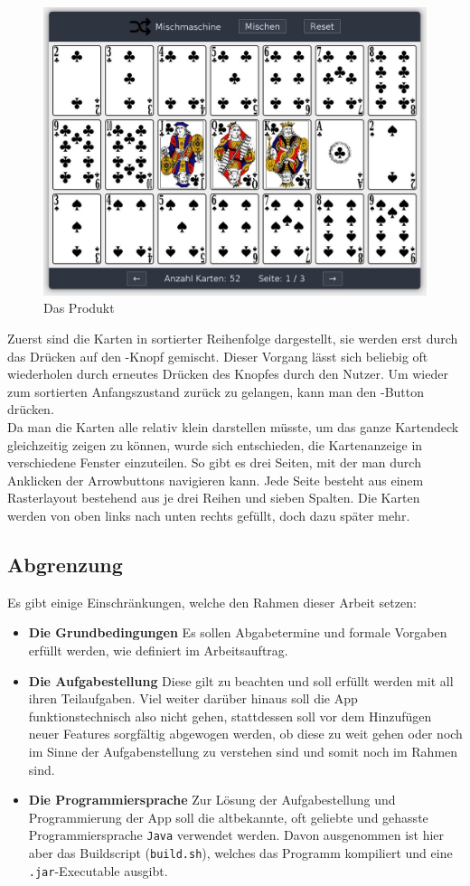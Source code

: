 \documentclass[a4paper,11pt]{article}
\begin{document}
\begin{figure}[H]
    \centering
    \includegraphics[width=.7\textwidth]{media/early-screenshot.jpg}
    \caption{Das Produkt}
\end{figure}

Zuerst sind die Karten in sortierter Reihenfolge dargestellt, sie werden erst durch das Drücken auf den -Knopf gemischt. Dieser Vorgang lässt sich beliebig oft wiederholen durch erneutes Drücken des Knopfes durch den Nutzer. Um wieder zum sortierten Anfangszustand zurück zu gelangen, kann man den -Button drücken.\\

Da man die Karten alle relativ klein darstellen müsste, um das ganze Kartendeck gleichzeitig zeigen zu können, wurde sich entschieden, die Kartenanzeige in verschiedene Fenster einzuteilen. So gibt es drei Seiten, mit der man durch Anklicken der Arrowbuttons navigieren kann. Jede Seite besteht aus einem Rasterlayout bestehend aus je drei Reihen und sieben Spalten. Die Karten werden von oben links nach unten rechts gefüllt, doch dazu später mehr.\\


\subsection{Abgrenzung}
Es gibt einige Einschränkungen, welche den Rahmen dieser Arbeit setzen:

\begin{itemize}
    \item \textbf{Die Grundbedingungen} Es sollen Abgabetermine und formale Vorgaben erfüllt werden, wie definiert im Arbeitsauftrag.
    \item \textbf{Die Aufgabestellung} Diese gilt zu beachten und soll erfüllt werden mit all ihren Teilaufgaben. Viel weiter darüber hinaus soll die App funktionstechnisch also nicht gehen, stattdessen soll vor dem Hinzufügen neuer Features sorgfältig abgewogen werden, ob diese zu weit gehen oder noch im Sinne der Aufgabenstellung zu verstehen sind und somit noch im Rahmen sind.
    \item \textbf{Die Programmiersprache} Zur Lösung der Aufgabestellung und Programmierung der App soll die altbekannte, oft geliebte und gehasste Programmiersprache \texttt{Java} verwendet werden. Davon ausgenommen ist hier aber das Buildscript (\texttt{build.sh}), welches das Programm kompiliert und eine \texttt{.jar}-Executable ausgibt.
\end{itemize}
\end{document}
